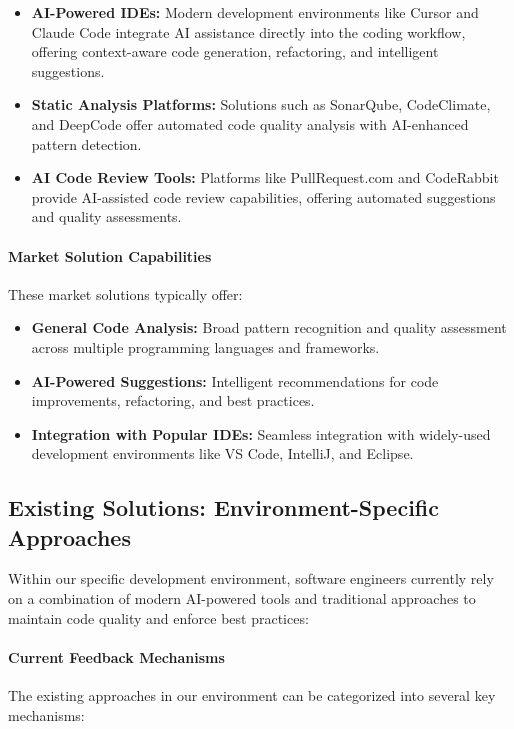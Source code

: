 \begin{spacing}{1.2}
\begin{itemize}
    \item \textbf{AI-Powered IDEs:} Modern development environments like Cursor and Claude Code integrate AI assistance directly into the coding workflow, offering context-aware code generation, refactoring, and intelligent suggestions.
    
    \item \textbf{Static Analysis Platforms:} Solutions such as SonarQube, CodeClimate, and DeepCode offer automated code quality analysis with AI-enhanced pattern detection.
    
    \item \textbf{AI Code Review Tools:} Platforms like PullRequest.com and CodeRabbit provide AI-assisted code review capabilities, offering automated suggestions and quality assessments.
\end{itemize}

\paragraph{Market Solution Capabilities}
These market solutions typically offer:

\begin{itemize}
    \item \textbf{General Code Analysis:} Broad pattern recognition and quality assessment across multiple programming languages and frameworks.
    
    \item \textbf{AI-Powered Suggestions:} Intelligent recommendations for code improvements, refactoring, and best practices.
    
    \item \textbf{Integration with Popular IDEs:} Seamless integration with widely-used development environments like VS Code, IntelliJ, and Eclipse.
\end{itemize}

\subsection{Existing Solutions: Environment-Specific Approaches}

Within our specific development environment, software engineers currently rely on a combination of modern AI-powered tools and traditional approaches to maintain code quality and enforce best practices:

\paragraph{Current Feedback Mechanisms}
The existing approaches in our environment can be categorized into several key mechanisms:


\end{spacing}
